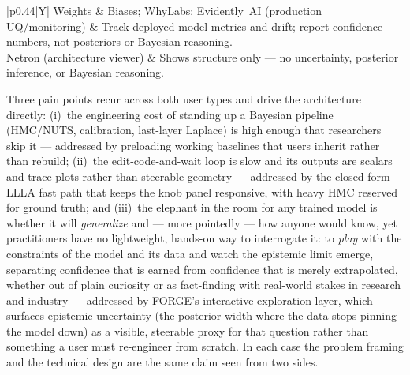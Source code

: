 \begin{table}[H]
\begin{tabularx}{\linewidth}{|p{0.44\linewidth}|Y|}
Weights \& Biases; WhyLabs; Evidently~AI (production UQ/monitoring) & Track deployed-model metrics and drift; report confidence numbers, not posteriors or Bayesian reasoning. \\ \hline
Netron (architecture viewer) & Shows structure only --- no uncertainty, posterior inference, or Bayesian reasoning. \\ \hline
\end{tabularx}
\caption{Comparable tools and how FORGE is differentiated}
\end{table}

Three pain points recur across both user types and drive the architecture directly: (i)~the engineering cost of standing up a Bayesian pipeline (HMC/NUTS, calibration, last-layer Laplace) is high enough that researchers skip it --- addressed by preloading working baselines that users inherit rather than rebuild; (ii)~the edit-code-and-wait loop is slow and its outputs are scalars and trace plots rather than steerable geometry --- addressed by the closed-form LLLA fast path that keeps the knob panel responsive, with heavy HMC reserved for ground truth; and (iii)~the elephant in the room for any trained model is whether it will \emph{generalize} and --- more pointedly --- how anyone would know, yet practitioners have no lightweight, hands-on way to interrogate it: to \emph{play} with the constraints of the model and its data and watch the epistemic limit emerge, separating confidence that is earned from confidence that is merely extrapolated, whether out of plain curiosity or as fact-finding with real-world stakes in research and industry --- addressed by FORGE's interactive exploration layer, which surfaces epistemic uncertainty (the posterior width where the data stops pinning the model down) as a visible, steerable proxy for that question rather than something a user must re-engineer from scratch. In each case the problem framing and the technical design are the same claim seen from two sides.

\preparedby

